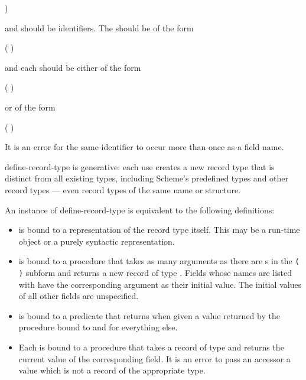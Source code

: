 \begin{entry}{%
)}

\syntax
{} and  should be identifiers.
The  should be of the form
\begin{scheme}
(  \dotsfoo)%
\end{scheme}
and each  should be either of the form
\begin{scheme}
( )%
\end{scheme}
or of the form
\begin{scheme}
(  )%
\end{scheme}

It is an error for the same identifier to occur more than once as a
field name.

{\cf define-record-type} is generative: each use creates a new record
type that is distinct from all existing types, including Scheme's
predefined types and other record types --- even record types of
the same name or structure.

An instance of {\cf define-record-type} is equivalent to the following
definitions:

\begin{itemize}

\item {} is bound to a representation of the record type
itself.  This may be a run-time object or a purely syntactic representation.

\item {} is bound to a procedure that takes as
  many arguments as there are s in the
  \texttt{( \dotsfoo)} subform and returns a
  new record of type .  Fields whose names are listed with
   have the corresponding argument as their
  initial value.  The initial values of all other fields are
  unspecified.

\item {} is bound to a predicate that returns \schtrue{} when given a
  value returned by the procedure bound to   and \schfalse{} for
  everything else.

\item Each  is bound to a procedure that takes a record of
  type  and returns the current value of the corresponding
  field.  It is an error to pass an accessor a value which is not a
  record of the appropriate type.


\end{itemize}
\end{entry}
